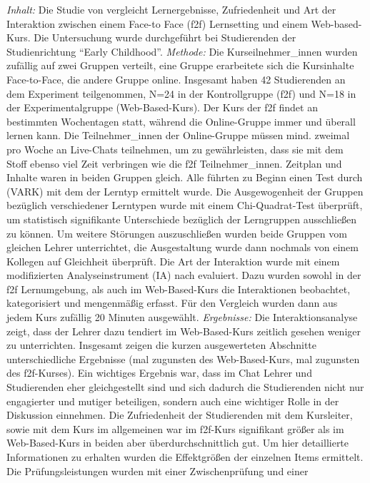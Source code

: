 \documentclass[12pt, bibliography=totoc]{scrartcl}
\begin{document}
\emph{Inhalt:} Die Studie von \textcite{mentzer2007two} vergleicht
Lernergebnisse, Zufriedenheit und Art der Interaktion zwischen einem
Face-to Face (f2f) Lernsetting und einem Web-based-Kurs. Die
Untersuchung wurde durchgeführt bei Studierenden der Studienrichtung
``Early Childhood''. \emph{Methode:} Die Kurseilnehmer\_innen wurden
zufällig auf zwei Gruppen verteilt, eine Gruppe erarbeitete sich die
Kursinhalte Face-to-Face, die andere Gruppe online. Insgesamt haben 42
Studierenden an dem Experiment teilgenommen, N=24 in der Kontrollgruppe
(f2f) und N=18 in der Experimentalgruppe (Web-Based-Kurs). Der Kurs der
f2f findet an bestimmten Wochentagen statt, während die Online-Gruppe
immer und überall lernen kann. Die Teilnehmer\_innen der Online-Gruppe
müssen mind. zweimal pro Woche an Live-Chats teilnehmen, um zu
gewährleisten, dass sie mit dem Stoff ebenso viel Zeit verbringen wie
die f2f Teilnehmer\_innen. Zeitplan und Inhalte waren in beiden Gruppen
gleich. Alle führten zu Beginn einen Test durch (VARK) mit dem der
Lerntyp ermittelt wurde. Die Ausgewogenheit der Gruppen bezüglich
verschiedener Lerntypen wurde mit einem Chi-Quadrat-Test überprüft, um
statistisch signifikante Unterschiede bezüglich der Lerngruppen
ausschließen zu können. Um weitere Störungen auszuschließen wurden beide
Gruppen vom gleichen Lehrer unterrichtet, die Ausgestaltung wurde dann
nochmals von einem Kollegen auf Gleichheit überprüft. Die Art der
Interaktion wurde mit einem modifizierten Analyseinstrument (IA) nach
\textcite{Flanders1961} evaluiert. Dazu wurden sowohl in der f2f
Lernumgebung, als auch im Web-Based-Kurs die Interaktionen beobachtet,
kategorisiert und mengenmäßig erfasst. Für den Vergleich wurden dann aus
jedem Kurs zufällig 20 Minuten ausgewählt. \emph{Ergebnisse:} Die
Interaktionsanalyse zeigt, dass der Lehrer dazu tendiert im
Web-Based-Kurs zeitlich gesehen weniger zu unterrichten. Insgesamt
zeigen die kurzen ausgewerteten Abschnitte unterschiedliche Ergebnisse
(mal zugunsten des Web-Based-Kurs, mal zugunsten des f2f-Kurses). Ein
wichtiges Ergebnis war, dass im Chat Lehrer und Studierenden eher
gleichgestellt sind und sich dadurch die Studierenden nicht nur
engagierter und mutiger beteiligen, sondern auch eine wichtiger Rolle in
der Diskussion einnehmen. Die Zufriedenheit der Studierenden mit dem
Kursleiter, sowie mit dem Kurs im allgemeinen war im f2f-Kurs
signifikant größer als im Web-Based-Kurs in beiden aber
überdurchschnittlich gut. Um hier detaillierte Informationen zu erhalten
wurden die Effektgrößen der einzelnen Items ermittelt. Die
Prüfungsleistungen wurden mit einer Zwischenprüfung und einer
\end{document}
